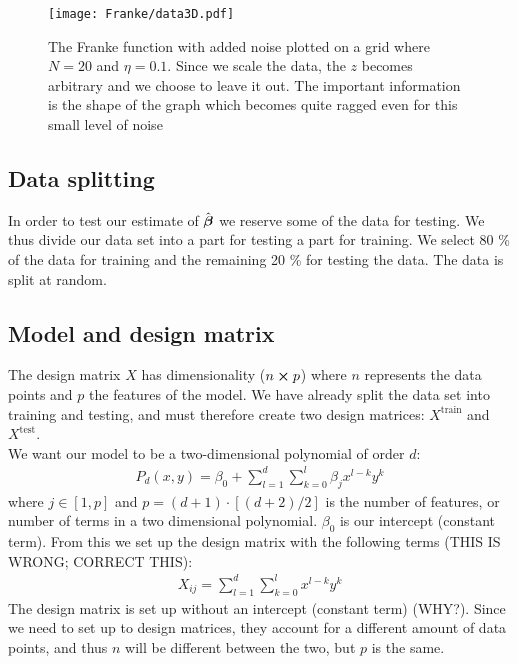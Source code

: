         \begin{figure}
            \texttt{[image: Franke/data3D.pdf]}
            \caption{The Franke function with added noise plotted on a grid where $N=20$ and $\eta=0.1$. Since we scale the data, the $z$ becomes arbitrary and we choose to leave it out. The important information is the shape of the graph which becomes quite ragged even for this small level of noise}
            \label{fig:franke_function_noise}
        \end{figure}

    \subsection{Data splitting}\label{sec:splitting}
        In order to test our estimate of $\hat{\boldsymbol{\beta}}$ we reserve some of the data for testing. We thus divide our data set into a part for testing a part for training. We select 80 \% of the data for training and the remaining 20 \% for testing the data. The data is split at random. 




    \subsection{Model and design matrix}\label{sec:model}
        The design matrix $X$ has dimensionality ($n\cross p$) where $n$ represents the data points and $p$ the features of the model. We have already split the data set into training and testing, and must therefore create two design matrices: $X^{\text{train}}$ and $X^{\text{test}}$. 
        \\
        We want our model to be a two-dimensional polynomial of order $d$:
        \begin{align*}
            P_d(x,y) = \beta_0 + \sum_{l=1}^d\sum_{k=0}^{l} \beta_jx^{l-k}y^k
        \end{align*}
        where $j\in[1,p]$ and $p=(d+1)\cdot\left[(d+2)/2\right]$ is the number of features, or number of terms in a two dimensional polynomial. $\beta_0$ is our intercept (constant term). From this we set up the design matrix with the following terms (THIS IS WRONG; CORRECT THIS):
        \begin{align}\label{eq:designmatrixequation}
            X_{ij} = \sum_{l=1}^d\sum_{k=0}^{l} x^{l-k}y^k
        \end{align}
        The design matrix is set up without an intercept (constant term) (WHY?). Since we need to set up to design matrices, they account for a different amount of data points, and thus $n$ will be different between the two, but $p$ is the same. 





